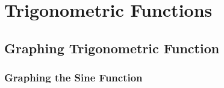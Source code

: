 
\section{Trigonometric Functions}\label{Trigonometric Functions}

\subsection{Graphing Trigonometric Function}\label{Graphing Trigonometric Functions}

\newpage
\subsubsection{Graphing the Sine Function}\label{Graphing the Sine Function}

